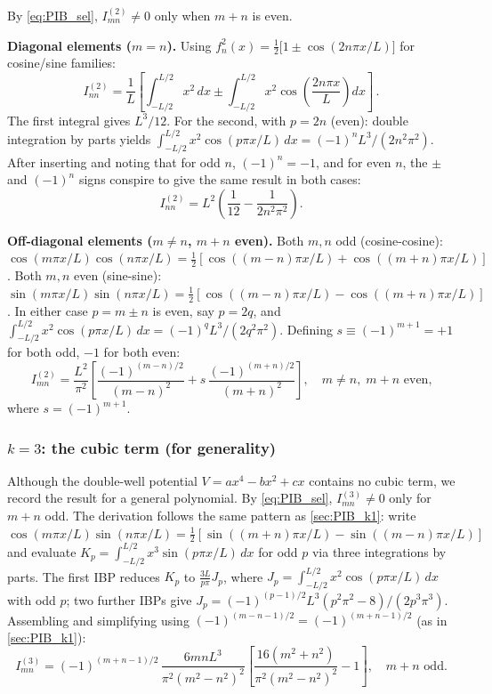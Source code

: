 By \cref{eq:PIB_sel}, $I_{mn}^{(2)} \neq 0$ only when $m+n$ is even.

\textbf{Diagonal elements ($m = n$).}
Using $f_n^2(x) = \frac{1}{2}\bigl[1 \pm \cos(2n\pi x/L)\bigr]$ for cosine/sine families:
\begin{equation}
  I_{nn}^{(2)} = \frac{1}{L}\left[\int_{-L/2}^{L/2}x^2\,dx
    \pm\int_{-L/2}^{L/2}x^2\cos\!\left(\frac{2n\pi x}{L}\right)dx\right]\,.
\end{equation}
The first integral gives $L^3/12$.  For the second, with $p = 2n$ (even):
double integration by parts yields $\int_{-L/2}^{L/2}x^2\cos(p\pi x/L)\,dx
= (-1)^n L^3/(2n^2\pi^2)$.  After inserting and noting that for odd $n$,
$(-1)^n = -1$, and for even $n$, the $\pm$ and $(-1)^n$ signs conspire to give
the same result in both cases:
\begin{equation}\label{eq:PIB_I2_diag}
  \boxed{I_{nn}^{(2)} = L^2\!\left(\frac{1}{12} - \frac{1}{2n^2\pi^2}\right).}
\end{equation}

\textbf{Off-diagonal elements ($m \neq n$, $m+n$ even).}
Both $m,n$ odd (cosine-cosine): $\cos(m\pi x/L)\cos(n\pi x/L)
= \frac{1}{2}[\cos((m-n)\pi x/L) + \cos((m+n)\pi x/L)]$.
Both $m,n$ even (sine-sine): $\sin(m\pi x/L)\sin(n\pi x/L)
= \frac{1}{2}[\cos((m-n)\pi x/L) - \cos((m+n)\pi x/L)]$.
In either case $p = m\pm n$ is even, say $p = 2q$, and
$\int_{-L/2}^{L/2}x^2\cos(p\pi x/L)\,dx = (-1)^q L^3/(2q^2\pi^2)$.
Defining $s \equiv (-1)^{m+1} = +1$ for both odd, $-1$ for both even:
\begin{equation}\label{eq:PIB_I2_offdiag}
  \boxed{I_{mn}^{(2)} = \frac{L^2}{\pi^2}\!\left[
    \frac{(-1)^{(m-n)/2}}{(m-n)^2}
    + s\,\frac{(-1)^{(m+n)/2}}{(m+n)^2}
  \right],\quad m\neq n,\;m+n\text{ even,}}
\end{equation}
where $s = (-1)^{m+1}$.

\subsubsection{$k = 3$: the cubic term (for generality)}\label{sec:PIB_k3}

Although the double-well potential $V = ax^4 - bx^2 + cx$ contains no cubic term,
we record the result for a general polynomial.  By \cref{eq:PIB_sel},
$I_{mn}^{(3)} \neq 0$ only for $m+n$ odd.
The derivation follows the same pattern as \cref{sec:PIB_k1}: write
$\cos(m\pi x/L)\sin(n\pi x/L) = \frac{1}{2}[\sin((m+n)\pi x/L)
- \sin((m-n)\pi x/L)]$ and evaluate $K_p = \int_{-L/2}^{L/2}x^3\sin(p\pi x/L)\,dx$
for odd $p$ via three integrations by parts.  The first IBP reduces $K_p$ to
$\frac{3L}{p\pi}J_p$, where $J_p = \int_{-L/2}^{L/2}x^2\cos(p\pi x/L)\,dx$
with odd $p$; two further IBPs give
$J_p = (-1)^{(p-1)/2}L^3(p^2\pi^2-8)/(2p^3\pi^3)$.
Assembling and simplifying using $(-1)^{(m-n-1)/2} = (-1)^{(m+n-1)/2}$ (as in
\cref{sec:PIB_k1}):
\begin{equation}\label{eq:PIB_I3}
  \boxed{I_{mn}^{(3)} = (-1)^{(m+n-1)/2}\,\frac{6mnL^3}{\pi^2(m^2-n^2)^2}
  \!\left[\frac{16(m^2+n^2)}{\pi^2(m^2-n^2)^2} - 1\right],\quad m+n\text{ odd.}}
\end{equation}

